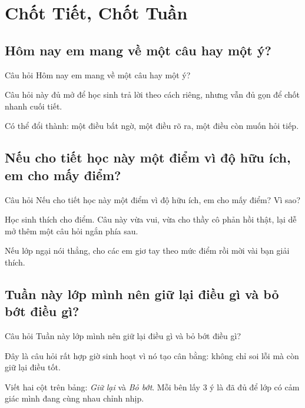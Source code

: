 \chapter{Chốt Tiết, Chốt Tuần}

\section{Hôm nay em mang về một câu hay một ý?}
\begin{cauhoibox}{Câu hỏi}
Hôm nay em mang về một câu hay một ý?
\end{cauhoibox}
\begin{taisaocoich}
Câu hỏi này đủ mở để học sinh trả lời theo cách riêng, nhưng vẫn đủ gọn để chốt nhanh cuối tiết.
\end{taisaocoich}
\begin{goiybien}
Có thể đổi thành: một điều bất ngờ, một điều rõ ra, một điều còn muốn hỏi tiếp.
\end{goiybien}
\ngancach

\section{Nếu cho tiết học này một điểm vì độ hữu ích, em cho mấy điểm?}
\begin{cauhoibox}{Câu hỏi}
Nếu cho tiết học này một điểm vì độ hữu ích, em cho mấy điểm? Vì sao?
\end{cauhoibox}
\begin{taisaocoich}
Học sinh thích cho điểm. Câu này vừa vui, vừa cho thầy cô phản hồi thật, lại dễ mở thêm một câu hỏi ngắn phía sau.
\end{taisaocoich}
\begin{goiybien}
Nếu lớp ngại nói thẳng, cho các em giơ tay theo mức điểm rồi mời vài bạn giải thích.
\end{goiybien}
\ngancach

\section{Tuần này lớp mình nên giữ lại điều gì và bỏ bớt điều gì?}
\begin{cauhoibox}{Câu hỏi}
Tuần này lớp mình nên giữ lại điều gì và bỏ bớt điều gì?
\end{cauhoibox}
\begin{taisaocoich}
Đây là câu hỏi rất hợp giờ sinh hoạt vì nó tạo cân bằng: không chỉ soi lỗi mà còn giữ lại điều tốt.
\end{taisaocoich}
\begin{goiybien}
Viết hai cột trên bảng: \textit{Giữ lại} và \textit{Bỏ bớt}. Mỗi bên lấy 3 ý là đã đủ để lớp có cảm giác mình đang cùng nhau chỉnh nhịp.
\end{goiybien}
\ngancach

